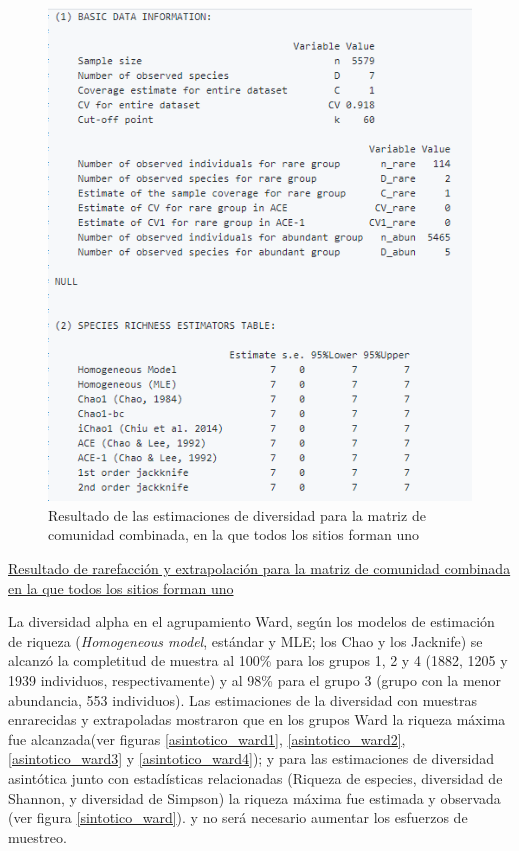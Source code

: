 \documentclass[11pt,]{article}
\begin{document}
\begin{figure}
\centering
\includegraphics{chao_asintotico.png}
\caption{Resultado de las estimaciones de diversidad para la matriz de
comunidad combinada, en la que todos los sitios forman uno
\label{fig:chao_asintotico}}
\end{figure}

\href{chao_noasintotico.png}{Resultado de rarefacción y extrapolación
para la matriz de comunidad combinada en la que todos los sitios forman
uno \label{fig:chao_noasintotico}}

La diversidad alpha en el agrupamiento Ward, según los modelos de
estimación de riqueza (\emph{Homogeneous model}, estándar y MLE; los
Chao y los Jacknife) se alcanzó la completitud de muestra al 100\% para
los grupos 1, 2 y 4 (1882, 1205 y 1939 individuos, respectivamente) y al
98\% para el grupo 3 (grupo con la menor abundancia, 553 individuos).
Las estimaciones de la diversidad con muestras enrarecidas y
extrapoladas mostraron que en los grupos Ward la riqueza máxima fue
alcanzada(ver figuras \ref{asintotico_ward1}, \ref{asintotico_ward2},
\ref{asintotico_ward3} y \ref{asintotico_ward4}); y para las
estimaciones de diversidad asintótica junto con estadísticas
relacionadas (Riqueza de especies, diversidad de Shannon, y diversidad
de Simpson) la riqueza máxima fue estimada y observada (ver figura
\ref{sintotico_ward}). y no será necesario aumentar los esfuerzos de
muestreo.
\end{document}

